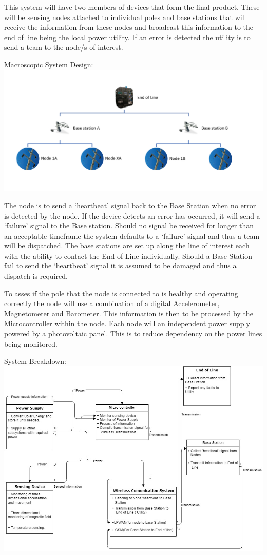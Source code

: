 \documentclass[12pt]{article}
\begin{document}
This system will have two members of devices that form the final product. These will be sensing nodes attached
to individual poles and base stations that will receive the information from these nodes and broadcast this
information to the end of line being the local power utility. If an error is detected the utility is to send
a team to the node/s of interest.

Macroscopic System Design:\\
\includegraphics[scale = 1]{Macroscopic system breakdown.PNG}

The node is to send a ‘heartbeat’ signal back to the Base Station when no error is detected by the node. 
If the device detects an error has occurred, it will send a ‘failure’ signal to the Base station. Should 
no signal be received for longer than an acceptable timeframe the system defaults to a ‘failure’ signal 
and thus a team will be dispatched. The base stations are set up along the line of interest each  with  
the ability to contact the End of Line individually. Should a Base Station fail to send the ‘heartbeat’ 
signal it is assumed to be damaged and thus a dispatch is required.

To asses if the pole that the node is connected to is healthy and operating correctly the node will use 
a combination of a digital Accelerometer, Magnetometer and Barometer. This information is then to be 
processed by the Microcontroller within the node. Each node will an independent power supply powered by 
a photovoltaic panel.  This is to reduce dependency on the power lines being monitored.

System Breakdown: \\
\includegraphics[scale = 0.6]{System Design.jpg}
\end{document}
